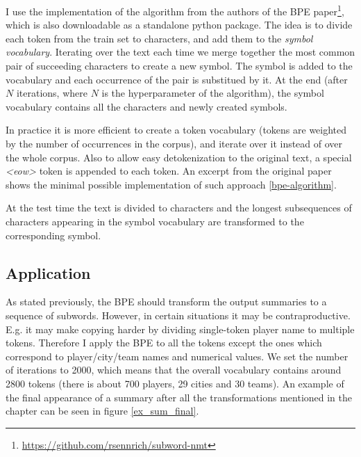 I use the implementation of the algorithm from the authors of the BPE paper\footnote{\url{https://github.com/rsennrich/subword-nmt}}, which is also downloadable as a standalone python package. The idea is to divide each token from the train set to characters, and add them to the \emph{symbol vocabulary}. Iterating over the text each time we merge together the most common pair of succeeding characters to create a new symbol. The symbol is added to the vocabulary and each occurrence of the pair is substitued by it. At the end (after $N$ iterations, where $N$ is the hyperparameter of the algorithm), the symbol vocabulary contains all the characters and newly created symbols.

In practice it is more efficient to create a token vocabulary (tokens are weigh\-ted by the number of occurrences in the corpus), and iterate over it instead of over the whole corpus. Also to allow easy detokenization to the original text, a special \emph{\textless eow\textgreater} token is appended to each token. An excerpt from the original paper shows the minimal possible implementation of such approach \ref{bpe-algorithm}.

At the test time the text is divided to characters and the longest subsequences of characters appearing in the symbol vocabulary are transformed to the corresponding symbol.

\subsection{Application}

As stated previously, the BPE should transform the output summaries to a sequence of subwords. However, in certain situations it may be contraproductive. E.g. it may make copying harder by dividing single-token player name to multiple tokens. Therefore I apply the BPE to all the tokens except the ones which correspond to player/city/team names and numerical values. We set the number of iterations to 2000, which means that the overall vocabulary contains around 2800 tokens (there is about 700 players, 29 cities and 30 teams). An example of the final appearance of a summary after all the transformations mentioned in the chapter can be seen in figure \ref{ex_sum_final}. 

